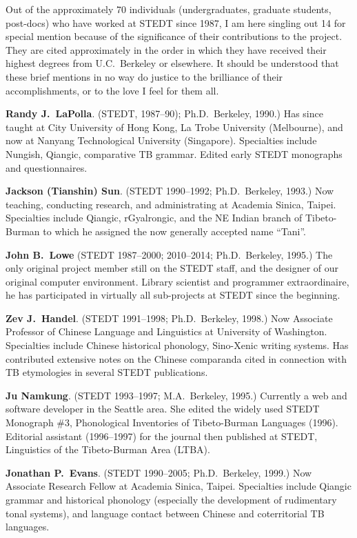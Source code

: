 Out of the approximately 70 individuals (undergraduates, graduate students, post-docs) who have worked at STEDT since 1987, I am here singling out 14 for special mention because of the significance of their contributions to the project. They are cited approximately in the order in which they have received their highest degrees from U.C.\ Berkeley or elsewhere. It should be understood that these brief mentions in no way do justice to the brilliance of their accomplishments, or to the love I feel for them all.

\textbf{Randy J.\ LaPolla}. (STEDT, 1987–90); Ph.D.\ Berkeley, 1990.) Has since taught at City University of Hong Kong, La Trobe University (Melbourne), and now at Nanyang Technological University (Singapore). Specialties include Nungish, Qiangic, comparative TB grammar. Edited early STEDT monographs and questionnaires.

\textbf{Jackson (Tianshin) Sun}. (STEDT 1990–1992; Ph.D.\ Berkeley, 1993.) Now teaching, conducting research, and administrating at Academia Sinica, Taipei. Specialties include Qiangic, rGyalrongic, and the NE Indian branch of Tibeto-Burman to which he assigned the now generally accepted name “Tani”.

\textbf{John B.\ Lowe} (STEDT 1987–2000; 2010–2014; Ph.D.\ Berkeley, 1995.) The only original project member still on the STEDT staff, and the designer of our original computer environment. Library scientist and programmer extraordinaire, he has participated in virtually all sub-projects at STEDT since the beginning.

\textbf{Zev J.\ Handel}. (STEDT 1991–1998; Ph.D.\ Berkeley, 1998.) Now Associate Professor of Chinese Language and Linguistics at University of Washington. Specialties include Chinese historical phonology, Sino-Xenic writing systems. Has contributed extensive notes on the Chinese comparanda cited in connection with TB etymologies in several STEDT publications.

\textbf{Ju Namkung}. (STEDT 1993–1997; M.A.\ Berkeley, 1995.) Currently a web and software developer in the Seattle area. She edited the widely used STEDT Monograph \#3, Phonological Inventories of Tibeto-Burman Languages (1996). Editorial assistant (1996–1997) for the journal then published at STEDT, Linguistics of the Tibeto-Burman Area (LTBA).

\textbf{Jonathan P.\ Evans}. (STEDT 1990–2005; Ph.D.\ Berkeley, 1999.) Now Associate Research Fellow at Academia Sinica, Taipei. Specialties include Qiangic grammar and historical phonology (especially the development of rudimentary tonal systems), and language contact between Chinese and coterritorial TB languages.

